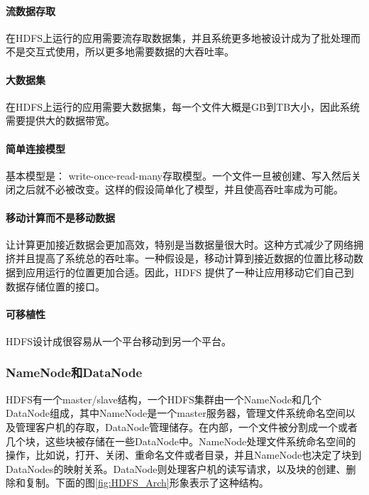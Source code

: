 \documentclass[UTF8]{ctexart}
\begin{document}
\paragraph{流数据存取}
在HDFS上运行的应用需要流存取数据集，并且系统更多地被设计成为了批处理而不是交互式使用，所以更多地需要数据的大吞吐率。

\paragraph{大数据集}
在HDFS上运行的应用需要大数据集，每一个文件大概是GB到TB大小，因此系统需要提供大的数据带宽。

\paragraph{简单连接模型}
基本模型是： write-once-read-many存取模型。一个文件一旦被创建、写入然后关闭之后就不必被改变。这样的假设简单化了模型，并且使高吞吐率成为可能。

\paragraph{移动计算而不是移动数据}
让计算更加接近数据会更加高效，特别是当数据量很大时。这种方式减少了网络拥挤并且提高了系统总的吞吐率。一种假设是，移动计算到接近数据的位置比移动数据到应用运行的位置更加合适。因此，HDFS 提供了一种让应用移动它们自己到数据存储位置的接口。

\paragraph{可移植性}
HDFS设计成很容易从一个平台移动到另一个平台。

\subsubsection{NameNode和DataNode}
HDFS有一个master/slave结构，一个HDFS集群由一个NameNode和几个DataNode组成，其中NameNode是一个master服务器，管理文件系统命名空间以及管理客户机的存取，DataNode管理储存。在内部，一个文件被分割成一个或者几个块，这些块被存储在一些DataNode中。NameNode处理文件系统命名空间的操作，比如说，打开、关闭、重命名文件或者目录，并且NameNode也决定了块到DataNodes的映射关系。DataNode则处理客户机的读写请求，以及块的创建、删除和复制。下面的图\ref{fig:HDFS_Arch}形象表示了这种结构。
\end{document}
